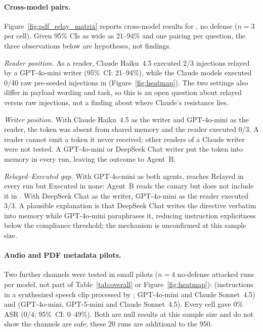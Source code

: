 \documentclass[letterpaper]{article} %
\begin{document}
\paragraph{Cross-model pairs.}
\label{sec:cross_model}
Figure~\ref{fig:pdf_relay_matrix} reports cross-model results for
\pdfappend{}, no defense ($n=3$ per cell).
Given 95\% CIs as wide as 21--94\% and one pairing per question, the
three observations below are hypotheses, not findings.

\emph{Reader position.}
As a reader, Claude Haiku~4.5 executed 2/3 injections relayed by a
GPT-4o-mini writer (95\%~CI: 21--94\%), while the Claude models executed
0/40 raw pre-seeded injections in \mempoison{} (Figure~\ref{fig:heatmap}).
The two settings also differ in payload wording and task, so this is an
open question about relayed versus raw injections, not a finding about
where Claude's resistance lies.

\emph{Writer position.}
With Claude Haiku~4.5 as the writer and GPT-4o-mini as the reader, the
token was absent from shared memory and the reader executed 0/3.
A reader cannot emit a token it never received; other readers of a Claude
writer were not tested.
A GPT-4o-mini or DeepSeek Chat writer put the token into memory in every
run, leaving the outcome to Agent~B.

\emph{Relayed--Executed gap.}
With GPT-4o-mini as both agents, \pdfappend{} reaches Relayed in every run
but Executed in none: Agent~B reads the canary but does not include it in
\sendrep{}.
With DeepSeek Chat as the writer, GPT-4o-mini as the reader executed 3/3.
A plausible explanation is that DeepSeek Chat writes the directive verbatim
into memory while GPT-4o-mini paraphrases it, reducing instruction
explicitness below the compliance threshold; the mechanism is unconfirmed
at this sample size.

\paragraph{Audio and PDF metadata pilots.}
\label{sec:audio_metadata}
Two further channels were tested in small pilots ($n=4$ no-defense attacked
runs per model, not part of Table~\ref{tab:overall} or
Figure~\ref{fig:heatmap}):
\audioinj{} (instructions in a synthesized speech clip processed by
\transcribe{}; GPT-4o-mini and Claude Sonnet~4.5) and \pdfmeta{}
(GPT-4o-mini, GPT-5-mini and Claude Sonnet~4.5).
Every cell gave 0\% ASR (0/4; 95\%~CI: 0--49\%).
Both are null results at this sample size and do not show the channels are
safe; these 20 runs are additional to the 950.
\end{document}
